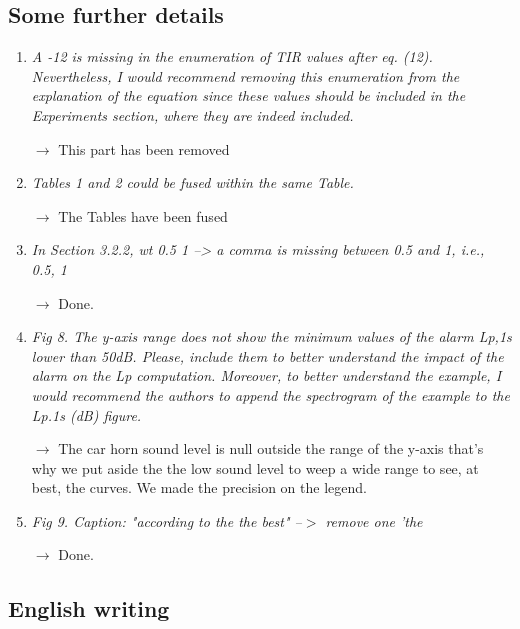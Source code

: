 \documentclass[10pt]{article}
\begin{document}
\subsection{Some further details}

\begin{enumerate}
\item \emph{A -12 is missing in the enumeration of TIR values after eq. (12). Nevertheless, I would recommend removing this enumeration from the explanation of the equation since these values should be included in the Experiments section, where they are indeed included.}

$\rightarrow$ This part has been removed

\item \emph{Tables 1 and 2 could be fused within the same Table.}

$\rightarrow$ The Tables have been fused

\item \emph{In Section 3.2.2, wt {0.5 1} --> a comma is missing between 0.5 and 1, i.e., {0.5, 1} }

$\rightarrow$ Done.

\item \emph{Fig 8. The y-axis range does not show the minimum values of the alarm Lp,1s lower than 50dB. Please, include them to better understand the impact of the alarm on the Lp computation. Moreover, to better understand the example, I would recommend the authors to append the spectrogram of the example to the Lp.1s (dB) figure.}

$\rightarrow$ The car horn sound level is null outside the range of the y-axis that's why we put aside the the low sound level to weep a wide range to see, at best, the curves. We made the precision on the legend.

\item \emph{Fig 9. Caption: "according to the the best" --$>$ remove one 'the}

$\rightarrow$ Done.

\end{enumerate}
\subsection{English writing}
\end{document}
